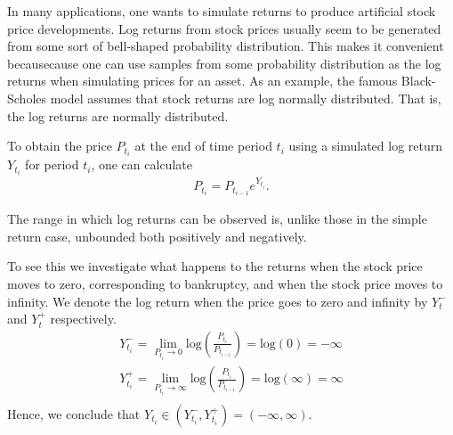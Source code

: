 In many applications, one wants to simulate returns to produce artificial stock price developments. Log returns from stock prices usually seem to be generated from some sort of bell-shaped probability distribution. This makes it convenient becausecause one can use samples from some probability distribution as the log returns when simulating prices for an asset. As an example, the famous Black-Scholes model assumes that stock returns are log normally distributed. That is, the log returns are normally distributed. 

To obtain the price $P_{t_i}$ at the end of time period $t_i$ using a simulated log return $Y_{t_i}$ for period $t_i$, one can calculate 
\begin{align*}
    P_{t_i} = P_{t_{i-1}}e^{Y_{t_i}}. %
\end{align*}

The range in which log returns can be observed is, unlike those in the simple return case, unbounded both positively and negatively. 
\begin{example}
    To see this we investigate what happens to the returns when the stock price moves to zero, corresponding to bankruptcy, and when the stock price moves to infinity. We denote the log return when the price goes to zero and infinity by $Y_t^-$ and $Y_t^+$ respectively.   
    \begin{align*}
        Y_{t_i}^- = \lim_{P_{t_i} \to 0} \mathrm{log} \left( \frac{P_{t_i}}{P_{t_{i-1}}}\right) = \mathrm{log}(0)= -\infty\\
        Y_{t_i}^+ =\lim_{P_{t_i} \to \infty} \mathrm{log}\left( \frac{P_{t_i}}{P_{t_{i-1}}}\right) = \mathrm{log}(\infty)= \infty\\    
    \end{align*}
    Hence, we conclude that $Y_{t_i} \in (Y_{t_i}^-,Y_{t_i}^+) = (-\infty,\infty)$. 
\end{example}

